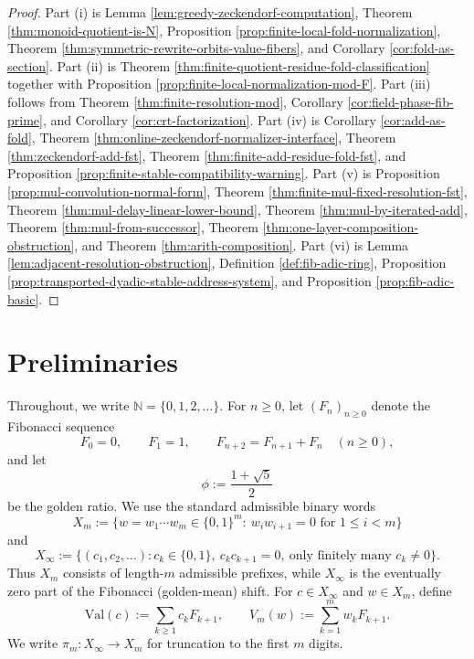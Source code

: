 \documentclass[12pt,a4paper]{article}
\theoremstyle{plain}
\theoremstyle{definition}
\numberwithin{equation}{section}
\newcommand{\NN}{\mathbb{N}}
\begin{document}
\begin{proof}
Part \textup{(i)} is Lemma \ref{lem:greedy-zeckendorf-computation}, Theorem \ref{thm:monoid-quotient-is-N}, Proposition \ref{prop:finite-local-fold-normalization}, Theorem \ref{thm:symmetric-rewrite-orbits-value-fibers}, and Corollary \ref{cor:fold-as-section}. Part \textup{(ii)} is Theorem \ref{thm:finite-quotient-residue-fold-classification} together with Proposition \ref{prop:finite-local-normalization-mod-F}. Part \textup{(iii)} follows from Theorem \ref{thm:finite-resolution-mod}, Corollary \ref{cor:field-phase-fib-prime}, and Corollary \ref{cor:crt-factorization}. Part \textup{(iv)} is Corollary \ref{cor:add-as-fold}, Theorem \ref{thm:online-zeckendorf-normalizer-interface}, Theorem \ref{thm:zeckendorf-add-fst}, Theorem \ref{thm:finite-add-residue-fold-fst}, and Proposition \ref{prop:finite-stable-compatibility-warning}. Part \textup{(v)} is Proposition \ref{prop:mul-convolution-normal-form}, Theorem \ref{thm:finite-mul-fixed-resolution-fst}, Theorem \ref{thm:mul-delay-linear-lower-bound}, Theorem \ref{thm:mul-by-iterated-add}, Theorem \ref{thm:mul-from-successor}, Theorem \ref{thm:one-layer-composition-obstruction}, and Theorem \ref{thm:arith-composition}. Part \textup{(vi)} is Lemma \ref{lem:adjacent-resolution-obstruction}, Definition \ref{def:fib-adic-ring}, Proposition \ref{prop:transported-dyadic-stable-address-system}, and Proposition \ref{prop:fib-adic-basic}.
\end{proof}

\section{Preliminaries}\label{sec:preliminaries}
Throughout, we write \(\NN=\{0,1,2,\dots\}\). For \(n\ge 0\), let \((F_n)_{n\ge 0}\) denote the Fibonacci sequence
\[
F_0=0,\qquad F_1=1,\qquad F_{n+2}=F_{n+1}+F_n\quad(n\ge 0),
\]
and let
\[
\phi:=\frac{1+\sqrt5}{2}
\]
be the golden ratio. We use the standard admissible binary words
\[
X_m:=\{w=w_1\cdots w_m\in\{0,1\}^m:\ w_i w_{i+1}=0\text{ for }1\le i<m\}
\]
and
\[
X_\infty:=\{(c_1,c_2,\dots): c_k\in\{0,1\},\ c_kc_{k+1}=0,\ \text{only finitely many }c_k\neq 0\}.
\]
Thus \(X_m\) consists of length-\(m\) admissible prefixes, while \(X_\infty\) is the eventually zero part of the Fibonacci (golden-mean) shift. For \(c\in X_\infty\) and \(w\in X_m\), define
\[
\mathrm{Val}(c):=\sum_{k\ge 1} c_k F_{k+1},
\qquad
V_m(w):=\sum_{k=1}^m w_k F_{k+1}.
\]
We write \(\pi_m:X_\infty\to X_m\) for truncation to the first \(m\) digits.
\end{document}
